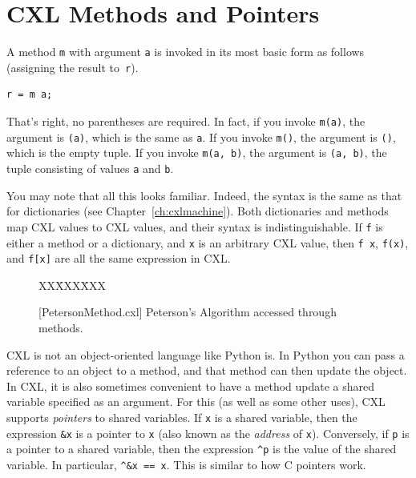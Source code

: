 \documentclass{report}
\newcommand{\cxlsource}[1]{
\begin{tabbing}
XX\=XXX\=XXX\kill
    
\end{tabbing}
}
\newenvironment{code}{
\tcolorbox
}{
\endtcolorbox
}
\begin{document}
\chapter{CXL Methods and Pointers}
\label{ch:method}

A method \texttt{m} with argument \texttt{a} is invoked in its
most basic form as follows (assigning the result to~\texttt{r}).
\begin{code}
\begin{verbatim}
r = m a;
\end{verbatim}
\end{code}
That's right, no parentheses are required.  In fact, if you invoke
\texttt{m(a)}, the argument is \texttt{(a)}, which is the same
as \texttt{a}.
If you invoke \texttt{m()}, the argument is \texttt{()},
which is the empty tuple.
If you invoke \texttt{m(a, b)}, the argument is \texttt{(a, b)},
the tuple consisting of values \texttt{a} and \texttt{b}.

You may note that all this looks familiar.  Indeed, the syntax
is the same as that for dictionaries (see Chapter~\ref{ch:cxlmachine}).
Both dictionaries and methods map CXL values to CXL values,
and their syntax is indistinguishable.
If \texttt{f} is either a method or a
dictionary, and \texttt{x} is an arbitrary CXL value, then
\texttt{f x}, \texttt{f(x)}, and \texttt{f[x]} are all
the same expression in CXL.

\begin{figure}
\begin{code}
\cxlsource{PetersonMethod}
\end{code}
\caption{[PetersonMethod.cxl] Peterson's Algorithm accessed through methods.}
\label{fig:petersonmethods}
\end{figure}

CXL is not an object-oriented language like Python is.  In Python
you can pass a reference to an object to a method, and that method
can then update the object.  In CXL, it is also sometimes convenient
to have a method update a shared variable specified as an argument.
For this (as well as some other uses), CXL supports \emph{pointers}
to shared variables.
If \texttt{x} is a shared variable, then the expression \texttt{\&x}
 is a pointer to \texttt{x} (also known as the \emph{address}
of \texttt{x}).
Conversely, if \texttt{p} is a pointer to a shared variable, then the
expression \texttt{\^{}p} is the value of the shared variable.
In particular, \texttt{\^{}\&x == x}.
This is similar to how C pointers work.
\end{document}
